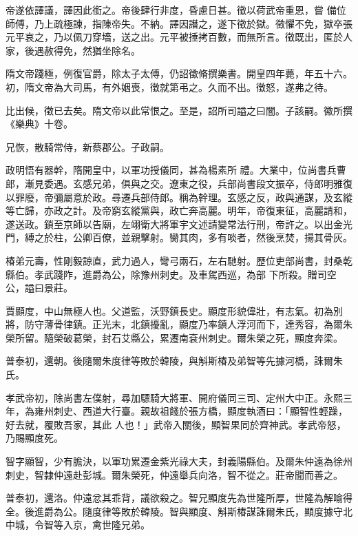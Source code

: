 \begin{pinyinscope}
 帝遂依譯議，譯因此銜之。帝後肆行非度，昏慮日甚。徵以荷武帝重恩，嘗
 備位師傅，乃上疏極諫，指陳帝失。不納。譯因譖之，遂下徵於獄。徵懼不免，獄卒張元平哀之，乃以佩刀穿墻，送之出。元平被捶拷百數，而無所言。徵既出，匿於人家，後遇赦得免，然猶坐除名。



 隋文帝踐極，例復官爵，除太子太傅，仍詔徵脩撰樂書。開皇四年薨，年五十六。初，隋文帝為大司馬，有外姻喪，徵就第弔之。久而不出。徵怒，遂弗之待。



 比出候，徵已去矣。隋文帝以此常恨之。至是，詔所司謚之曰闇。子該嗣。徽所撰《樂典》十卷。



 兄恢，散騎常侍，新蔡郡公。子政嗣。



 政明悟有器幹，隋開皇中，以軍功授儀同，甚為楊素所
 禮。大業中，位尚書兵曹郎，漸見委遇。玄感兄弟，俱與之交。遼東之役，兵部尚書段文振卒，侍郎明雅復以罪廢，帝彌屬意於政。尋遷兵部侍郎。稱為幹理。玄感之反，政與通謀，及玄縱等亡歸，亦政之計。及帝窮玄縱黨與，政亡奔高麗。明年，帝復東征，高麗請和，遂送政。鎖至京師以告廟，左翊衛大將軍宇文述請變常法行刑，帝許之。以出金光門，縛之於柱，公卿百僚，並親擊射。臠其肉，多有啖者，然後烹焚，揚其骨灰。



 椿弟元壽，性剛毅諒直，武力過人，彎弓兩石，左右馳射。歷位吏部尚書，封桑乾縣伯。孝武踐阼，進爵為公，除豫州刺史。及車駕西巡，為部
 下所殺。贈司空公，謚曰景莊。



 賈顯度，中山無極人也。父道監，沃野鎮長史。顯度形貌偉壯，有志氣。初為別將，防守薄骨律鎮。正光末，北鎮擾亂，顯度乃率鎮人浮河而下，達秀容，為爾朱榮所留。隨榮破葛榮，封石艾縣公，累遷南袞州刺史。爾朱榮之死，顯度奔梁。



 普泰初，還朝。後隨爾朱度律等敗於韓陵，與斛斯椿及弟智等先據河橋，誅爾朱氏。



 孝武帝初，除尚書左僕射，尋加驃騎大將軍、開府儀同三司、定州大中正。永熙三年，為雍州刺史、西道大行臺。親故祖餞於張方橋，顯度執酒曰：「顯智性輕躁，好去就，覆敗吾家，其此
 人也！」武帝入關後，顯智果同於齊神武。孝武帝怒，乃賜顯度死。



 智字顯智，少有膽決，以軍功累遷金紫光祿大夫，封義陽縣伯。及爾朱仲遠為徐州刺史，智隸仲遠赴彭城。爾朱榮死，仲遠舉兵向洛，智不從之。莊帝聞而善之。



 普泰初，還洛。仲遠忿其乖背，議欲殺之。智兄顯度先為世隆所厚，世隆為解喻得全。後進爵為公。隨度律等敗於韓陵。智與顯度、斛斯椿謀誅爾朱氏，顯度據守北中城，令智等入京，禽世隆兄弟。




\end{pinyinscope}
